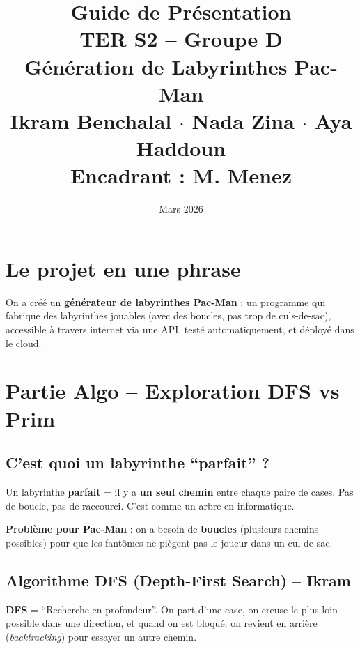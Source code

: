 \documentclass[12pt,a4paper]{article}
\title{
    \vspace{-1cm}
    {\Huge\bfseries Guide de Présentation}\\[0.5cm]
    {\Large TER S2 -- Groupe D}\\[0.3cm]
    {\large Génération de Labyrinthes Pac-Man}\\[0.5cm]
    {\normalsize Ikram Benchalal $\cdot$ Nada Zina $\cdot$ Aya Haddoun}\\
    {\normalsize Encadrant : M. Menez}
}
\date{Mars 2026}
\begin{document}
\maketitle
\tableofcontents
\newpage

\section{Le projet en une phrase}

On a créé un \textbf{générateur de labyrinthes Pac-Man} : un programme qui fabrique des labyrinthes jouables (avec des boucles, pas trop de culs-de-sac), accessible à travers internet via une API, testé automatiquement, et déployé dans le cloud.

\section{Partie Algo -- Exploration DFS vs Prim}

\subsection{C'est quoi un labyrinthe ``parfait'' ?}

Un labyrinthe \textbf{parfait} = il y a \textbf{un seul chemin} entre chaque paire de cases. Pas de boucle, pas de raccourci. C'est comme un arbre en informatique.

\textbf{Problème pour Pac-Man} : on a besoin de \textbf{boucles} (plusieurs chemins possibles) pour que les fantômes ne piègent pas le joueur dans un cul-de-sac.

\subsection{Algorithme DFS (Depth-First Search) -- Ikram}

\begin{definitionbox}
\textbf{DFS} = ``Recherche en profondeur''. On part d'une case, on creuse le plus loin possible dans une direction, et quand on est bloqué, on revient en arrière (\textit{backtracking}) pour essayer un autre chemin.
\end{definitionbox}
\end{document}
